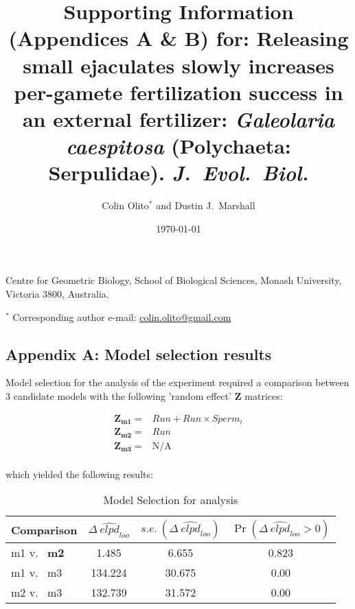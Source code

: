 \documentclass{article}
\title{Supporting Information (Appendices A \& B) for: Releasing small ejaculates slowly increases per-gamete fertilization success in an external fertilizer: \textit{Galeolaria caespitosa} (Polychaeta: Serpulidae). \textit{J.~Evol.~Biol.}}
\author{Colin Olito$^{\ast}$ and Dustin J.~Marshall}
\date{\today}
\begin{document}
\maketitle

\noindent{} Centre for Geometric Biology, School of Biological Sciences, Monash University, Victoria 3800, Australia.
\bigskip

\noindent{} $^\ast$ Corresponding author e-mail: \url{colin.olito@gmail.com}
\bigskip

\newpage


\subsection*{Appendix A: Model selection results}
\renewcommand{\theequation}{S\arabic{equation}}
\setcounter{equation}{0}
\renewcommand{\thefigure}{S\arabic{figure}}
\setcounter{figure}{0}
\renewcommand{\thetable}{S\arabic{table}}
\setcounter{table}{0}


Model selection for the analysis of the  experiment required a comparison between 3 candidate models with the following 'random effect' $\mathbf{Z}$ matrices:

\begin{align*}
	\mathbf{Z_{m1}} = &Run + Run \times Sperm_i \\
	\mathbf{Z_{m2}} = &Run \\
	\mathbf{Z_{m3}} = &\text{N/A} \\
\end{align*}

\noindent{} which yielded the following results: 

\begin{table}[!ht]
\caption{Model Selection for  analysis}
\label{Table:InvestModComp}
\centering
\begin{tabular}{l c c c } \hline
Comparison & $\Delta~\widehat{\textit{elpd}}_{\textit{loo}}$ & $s.e.~(\Delta~\widehat{\textit{elpd}}_{\textit{loo}})$ & $\Pr(\Delta~\widehat{\textit{elpd}}_{\textit{loo}} > 0)$ \\
\hline
m1 v.~ \textbf{m2}  & 1.485   & 6.655  & 0.823 \\
m1 v.~ m3 & 134.224 & 30.675 & 0.00  \\
m2 v.~ m3 & 132.739 & 31.572 & 0.00  \\
\hline
\end{tabular}
\bigskip{}
\end{table}
\bigskip
\end{document}
